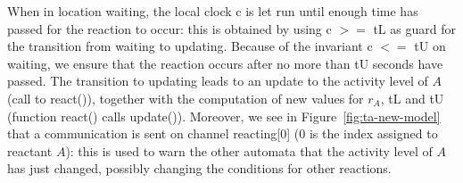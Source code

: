 \documentclass{bmcart}
\begin{document}
When in location {\sf waiting}, the local clock {\sf c}
is let run until enough time has passed for the reaction to occur: this is obtained by using {\sf c $>=$ tL} as guard
for the transition from {\sf waiting} to {\sf updating}.
Because of the invariant {\sf c $<=$ tU} on {\sf waiting}, we ensure that the reaction occurs after no more than {\sf tU} seconds have passed.
The transition to {\sf updating} leads to an update to the activity level of $A$ (call to {\sf react()}), together with the computation of new values for $r_A$,
{\sf tL} and {\sf tU} (function {\sf react()} calls {\sf update()}). Moreover, we see in Figure~\ref{fig:ta-new-model}
that a communication is sent on channel {\sf reacting[0]} ($0$ is the index
assigned to reactant $A$): this is used to warn
the other automata that the activity level of $A$ has just changed, possibly changing the conditions for
other reactions.
\end{document}
